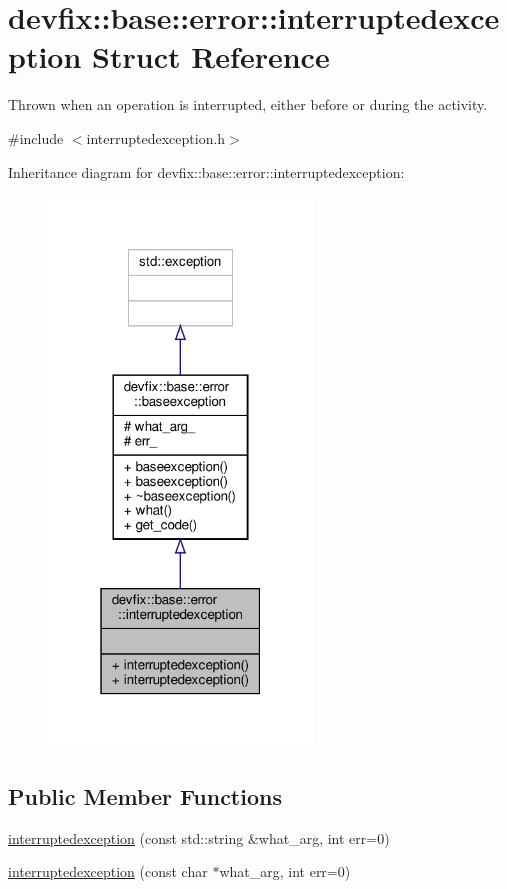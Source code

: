 \hypertarget{structdevfix_1_1base_1_1error_1_1interruptedexception}{}\section{devfix\+:\+:base\+:\+:error\+:\+:interruptedexception Struct Reference}
\label{structdevfix_1_1base_1_1error_1_1interruptedexception}


Thrown when an operation is interrupted, either before or during the activity.  




{\ttfamily \#include $<$interruptedexception.\+h$>$}



Inheritance diagram for devfix\+:\+:base\+:\+:error\+:\+:interruptedexception\+:\nopagebreak
\begin{figure}[H]
\begin{center}
\leavevmode
\includegraphics[width=199pt]{structdevfix_1_1base_1_1error_1_1interruptedexception__inherit__graph}
\end{center}
\end{figure}
\subsection*{Public Member Functions}
\begin{DoxyCompactItemize}
\item 
\hyperlink{structdevfix_1_1base_1_1error_1_1interruptedexception_ab89281cb08ca7481da32bde8da8e7a00}{interruptedexception} (const std\+::string \&what\+\_\+arg, int err=0)
\item 
\hyperlink{structdevfix_1_1base_1_1error_1_1interruptedexception_ac84d255100c72753ea35f8e7007413c1}{interruptedexception} (const char $\ast$what\+\_\+arg, int err=0)
\end{DoxyCompactItemize}
